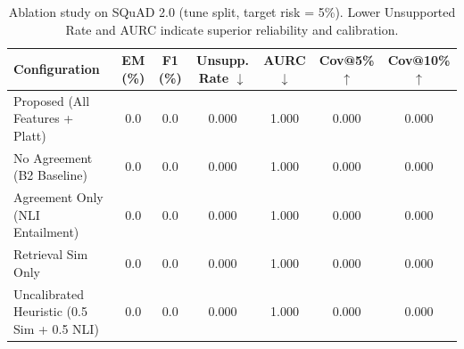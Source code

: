 \begin{table}[htbp]
\centering
\caption{Ablation study on SQuAD 2.0 (tune split, target risk = 5\%). Lower Unsupported Rate and AURC indicate superior reliability and calibration.}
\label{tab:ablation}
\begin{tabular}{lcccccc}
\toprule
\textbf{Configuration} & \textbf{EM (\%)} & \textbf{F1 (\%)} & \textbf{Unsupp. Rate $\downarrow$} & \textbf{AURC $\downarrow$} & \textbf{Cov@5\% $\uparrow$} & \textbf{Cov@10\% $\uparrow$} \\
\midrule
Proposed (All Features + Platt) & 0.0 & 0.0 & 0.000 & 1.000 & 0.000 & 0.000 \\
No Agreement (B2 Baseline) & 0.0 & 0.0 & 0.000 & 1.000 & 0.000 & 0.000 \\
Agreement Only (NLI Entailment) & 0.0 & 0.0 & 0.000 & 1.000 & 0.000 & 0.000 \\
Retrieval Sim Only & 0.0 & 0.0 & 0.000 & 1.000 & 0.000 & 0.000 \\
Uncalibrated Heuristic (0.5 Sim + 0.5 NLI) & 0.0 & 0.0 & 0.000 & 1.000 & 0.000 & 0.000 \\
\bottomrule
\end{tabular}
\end{table}